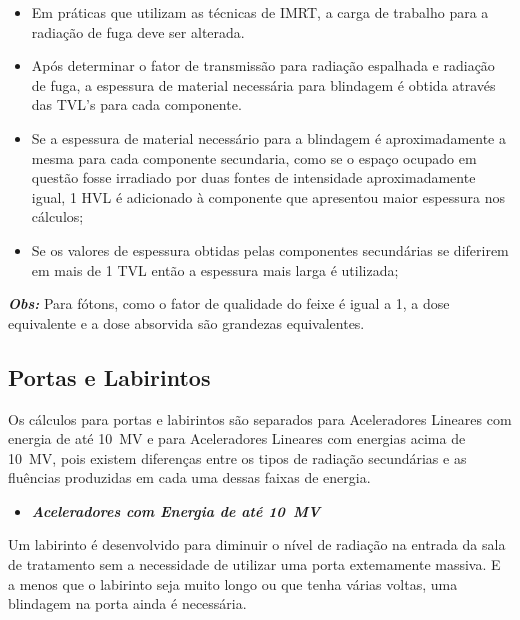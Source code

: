 \documentclass[11pt,a4paper]{article}
\begin{document}
            \begin{itemize}
                \item Em práticas que utilizam as técnicas de IMRT, a carga de trabalho para a radiação de fuga deve ser alterada.
                
                \item Após determinar o fator de transmissão para radiação espalhada e radiação de fuga, a espessura de material necessária para blindagem é obtida através das TVL's para cada componente.
                
                \item Se a espessura de material necessário para a blindagem é aproximadamente a mesma para cada componente secundaria, como se o espaço ocupado em questão fosse irradiado por duas fontes de intensidade aproximadamente igual,  1 HVL é adicionado à componente que apresentou maior espessura nos cálculos;
                
                \item Se os valores de espessura obtidas pelas componentes secundárias se diferirem em mais de 1 TVL então a espessura mais larga é utilizada;
            \end{itemize}

        
        
            \textbf{\textit{\textcolor{CarnationPink}{Obs:}}} Para fótons, como o fator de qualidade do feixe é igual a 1, a dose equivalente e a dose absorvida são grandezas equivalentes. 
            
        
        \subsection{Portas e Labirintos}

            Os cálculos para portas e labirintos são separados para Aceleradores Lineares com energia de até \qty{10}{MV} e para Aceleradores Lineares com energias acima de \qty{10}{MV}, pois existem diferenças entre os tipos de radiação secundárias e as fluências produzidas em cada uma dessas faixas de energia.

            \begin{itemize}
                \item \textbf{\textit{\textcolor{CarnationPink}{Aceleradores com Energia de até \qty{10}{MV}}}}
            \end{itemize}
            

            Um labirinto é desenvolvido para diminuir o nível de radiação na entrada da sala de tratamento sem a necessidade de utilizar uma porta extemamente massiva. E a menos que o labirinto seja muito longo ou que tenha várias voltas, uma blindagem na porta ainda é necessária.
\end{document}
